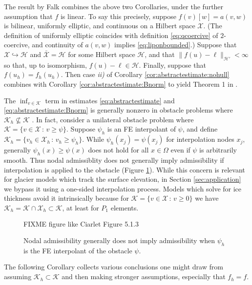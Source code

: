 \documentclass[hidelinks,onefignum,onetabnum,final]{siamart220329}  %
\newcommand{\cH}{\mathcal{H}}
\newcommand{\cK}{\mathcal{K}}
\newcommand{\cX}{\mathcal{X}}
\begin{document}
The result by Falk \cite{Falk1974} combines the above two Corollaries, under the further assumption that $f$ is linear.  To say this precisely, suppose $f(v)[w]=a(v,w)$ is bilinear, uniformly elliptic, and continuous on a Hilbert space $\cX$.  (The definition of uniformly elliptic coincides with definition \eqref{eq:qcoercive} of $2$-coercive, and continuity of $a(v,w)$ implies \eqref{eq:liponbounded}.)  Suppose that $\cX\hookrightarrow \cH$ and $\bar{\cX} = \cH$ for some Hilbert space $\cH$, and that $\|f(u)-\ell\|_{\cH'} < \infty$ so that, up to isomorphism, $f(u)-\ell \in \cH$.  Finally, suppose that $f(u_h)=f_h(u_h)$.  Then case \emph{ii)} of Corollary \ref{cor:abstractestimate:nohull} combines with Corollary \ref{cor:abstractestimate:Bnorm} to yield Theorem 1 in \cite{Falk1974}.

The $\inf_{v\in\cK}$ term in estimates \eqref{eq:abstractestimate} and \eqref{eq:abstractestimate:Bnorm} is generally nonzero in obstacle problems where $\cK_h \nsubseteq \cK$ \cite{Ciarlet2002}.  In fact, consider a unilateral obstacle problem where $\cK=\{v \in \cX\,:\,v\ge \psi\}$.  Suppose $\psi_h$ is an FE interpolant of $\psi$, and define $\cK_h=\{v_h \in \cX_h\,:\,v_h\ge \psi_h\}$.  While $\psi_h(x_j)=\psi(x_j)$ for interpolation nodes $x_j$, generally $\psi_h(x) \ge \psi(x)$ does not hold for all $x\in\Omega$ even if $\psi$ is arbitrarily smooth.  Thus nodal admissiblity does not generally imply admissibility if interpolation is applied to the obstacle (Figure \ref{fig:nonadmissible}).  While this concern is relevant for glacier models which track the surface elevation, in Section \ref{sec:application} we bypass it using a one-sided interpolation process.  Models which solve for ice thickness avoid it intrinsically because for $\cK = \{v\in\cX\,:\,v\ge 0\}$ we have $\cK_h=\cK\cap\cX_h \subset \cK$, at least for $P_1$ elements.

\begin{figure}[ht]
\begin{center}
FIXME figure like Ciarlet Figure 5.1.3 %
\end{center}
\caption{Nodal admissibility generally does not imply admissibility when $\psi_h$ is the FE interpolant of the obstacle $\psi$.}
\label{fig:nonadmissible}
\end{figure}

The following Corollary collects various conclusions one might draw from assuming $\cK_h \subset \cK$ and then making stronger assumptions, especially that $f_h=f$.
\end{document}
